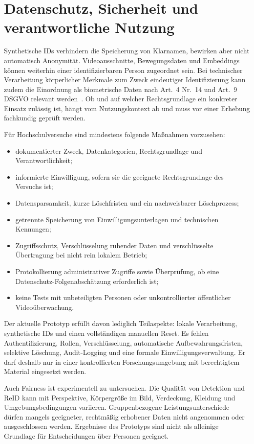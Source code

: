 \documentclass[runningheads]{llncs}
\begin{document}
\section{Datenschutz, Sicherheit und verantwortliche Nutzung}
\label{sec:privacy}

Synthetische IDs verhindern die Speicherung von Klarnamen, bewirken aber nicht automatisch Anonymität. Videoausschnitte, Bewegungsdaten und Embeddings können weiterhin einer identifizierbaren Person zugeordnet sein. Bei technischer Verarbeitung körperlicher Merkmale zum Zweck eindeutiger Identifizierung kann zudem die Einordnung als biometrische Daten nach Art.~4 Nr.~14 und Art.~9 DSGVO relevant werden~\cite{gdpr,edpb-video}. Ob und auf welcher Rechtsgrundlage ein konkreter Einsatz zulässig ist, hängt vom Nutzungskontext ab und muss vor einer Erhebung fachkundig geprüft werden.

Für Hochschulversuche sind mindestens folgende Maßnahmen vorzusehen:

\begin{itemize}
\item dokumentierter Zweck, Datenkategorien, Rechtsgrundlage und Verantwortlichkeit;
\item informierte Einwilligung, sofern sie die geeignete Rechtsgrundlage des Versuchs ist;
\item Datensparsamkeit, kurze Löschfristen und ein nachweisbarer Löschprozess;
\item getrennte Speicherung von Einwilligungsunterlagen und technischen Kennungen;
\item Zugriffsschutz, Verschlüsselung ruhender Daten und verschlüsselte Übertragung bei nicht rein lokalem Betrieb;
\item Protokollierung administrativer Zugriffe sowie Überprüfung, ob eine Datenschutz-Folgenabschätzung erforderlich ist;
\item keine Tests mit unbeteiligten Personen oder unkontrollierter öffentlicher Videoüberwachung.
\end{itemize}

Der aktuelle Prototyp erfüllt davon lediglich Teilaspekte: lokale Verarbeitung, synthetische IDs und einen vollständigen manuellen Reset. Es fehlen Authentifizierung, Rollen, Verschlüsselung, automatische Aufbewahrungsfristen, selektive Löschung, Audit-Logging und eine formale Einwilligungsverwaltung. Er darf deshalb nur in einer kontrollierten Forschungsumgebung mit berechtigtem Material eingesetzt werden.

Auch Fairness ist experimentell zu untersuchen. Die Qualität von Detektion und ReID kann mit Perspektive, Körpergröße im Bild, Verdeckung, Kleidung und Umgebungsbedingungen variieren. Gruppenbezogene Leistungsunterschiede dürfen mangels geeigneter, rechtmäßig erhobener Daten nicht angenommen oder ausgeschlossen werden. Ergebnisse des Prototyps sind nicht als alleinige Grundlage für Entscheidungen über Personen geeignet.
\end{document}
